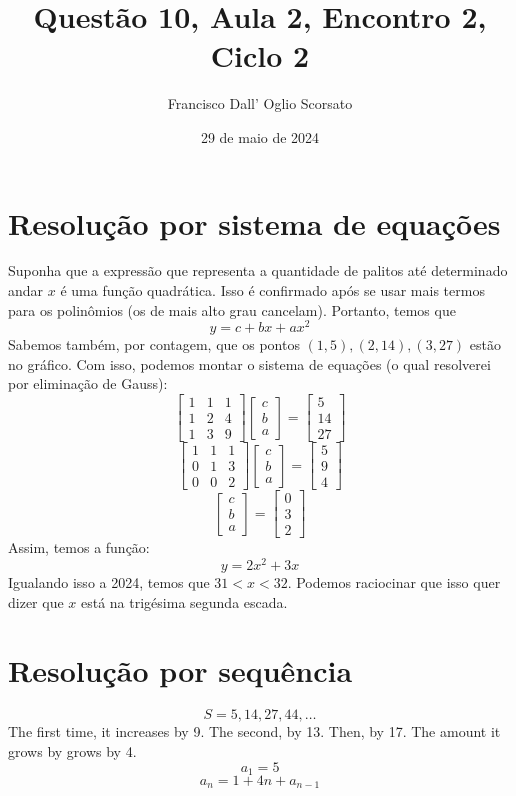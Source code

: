 \documentclass{article}
\title{Questão 10, Aula 2, Encontro 2, Ciclo 2}
\author{Francisco Dall' Oglio Scorsato}
\date{29 de maio de 2024}
\begin{document}
\maketitle

\section{Resolução por sistema de equações}
Suponha que a expressão que representa a quantidade de palitos até determinado andar \(x\) é uma função quadrática. Isso é confirmado após se usar mais termos para os polinômios (os de mais alto grau cancelam).
Portanto, temos que \[y=c+bx+ax^2\] Sabemos também, por contagem, que os pontos \((1, 5), (2,14), (3, 27)\) estão no gráfico. Com isso, podemos montar o sistema de equações (o qual resolverei por eliminação de Gauss):
\[\begin{bmatrix}
    1 & 1 & 1\\
    1 & 2 & 4\\
    1 & 3 & 9
\end{bmatrix}
\begin{bmatrix}
    c\\
    b\\
    a
\end{bmatrix}
=
\begin{bmatrix}
    5\\
    14\\
    27
\end{bmatrix}\]
\[\begin{bmatrix}
    1 & 1 & 1\\
    0 & 1 & 3\\
    0 & 0 & 2
\end{bmatrix}
\begin{bmatrix}
    c\\
    b\\
    a
\end{bmatrix}
=
\begin{bmatrix}
    5\\
    9\\
    4
\end{bmatrix}\]    
\[\begin{bmatrix}
    c\\
    b\\
    a
\end{bmatrix}
=
\begin{bmatrix}
    0\\
    3\\
    2
\end{bmatrix}\]
Assim, temos a função:
\[y=2x^2+3x\]
Igualando isso a 2024, temos que \(31<x<32\). Podemos raciocinar que isso quer dizer que \(x\) está na trigésima segunda escada.

\section{Resolução por sequência}
\[S={5,14,27,44,\dots}\]
The first time, it increases by 9. The second, by 13. Then, by 17. The amount it grows by grows by 4.
\[a_1 = 5\]
\[a_n = 1+4n+a_{n-1}\]
\end{document}

